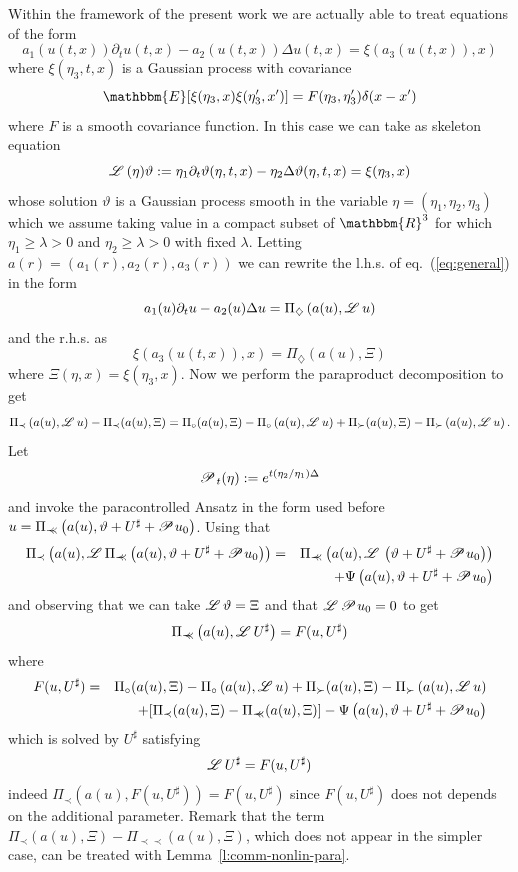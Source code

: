 \documentclass[11pt,reqno]{amsart}
\newcommand{\assign}{:=}
\newcommand{\precprec}{\prec\!\!\!\prec}
\newcommand{\LL}{\mathscr{L} \hspace{.2em}}
\newcommand{\PP}{\mathscr{P} \hspace{.1em}}
\begin{document}
Within the framework of the present work we are actually able to treat
equations of the form
\begin{equation}
  a_1 (u (t, x)) \partial_t u (t, x) - a_2 (u (t, x)) \Delta u (t, x) = \xi
  (a_3 (u (t, x)), x) \label{eq:general}
\end{equation}
where $\xi (\eta_3, t, x)$ is a Gaussian process with covariance
\[ \mathbbm{E} [\xi (\eta_3, x) \xi (\eta'_3, x')] = F (\eta_3, \eta'_3)
   \delta (x - x') \]
where $F$ is a smooth covariance function. In this case we can take as
skeleton equation
\[ \LL (\eta) \vartheta \assign \eta_1 \partial_t \vartheta (\eta, t, x) -
   \eta_2 \Delta \vartheta (\eta, t, x) = \xi (\eta_3, x) \]
whose solution $\vartheta$ is a Gaussian process smooth in the variable $\eta
= (\eta_1, \eta_2, \eta_3)$ which we assume taking value in a compact subset
of $\mathbbm{R}^3$ for which $\eta_1 \geqslant \lambda > 0$ and $\eta_2
\geqslant \lambda > 0$ with fixed $\lambda$. Letting $a (r) = (a_1 (r), a_2
(r), a_3 (r))$ we can rewrite the l.h.s. of eq.~(\ref{eq:general}) in the form
\[ a_1 (u) \partial_t u - a_2 (u) \Delta u = \Pi_{\diamondsuit} \left( a (u),
   \LL u \right) \]
and the r.h.s. as
\[ \xi (a_3 (u (t, x)), x) = \Pi_{\diamondsuit} (a (u), \Xi) \]
where $\Xi (\eta, x) = \xi (\eta_3, x)$. Now we perform the paraproduct
decomposition to get
\[ \Pi_{\prec} \left( a (u), \LL u \right) - \Pi_{\prec} (a (u), \Xi) =
   \Pi_{\circ} (a (u), \Xi) - \Pi_{\circ} \left( a (u), \LL u \right) +
   \Pi_{\succ} (a (u), \Xi) - \Pi_{\succ} \left( a (u), \LL u \right) . \]
Let
\[ \PP_t (\eta) \assign e^{t (\eta_2 / \eta_1) \Delta} \]
and invoke the paracontrolled Ansatz in the form used before $u =
\Pi_{\precprec} \left( a (u), \vartheta + U^{\sharp} + \PP u_0 \right)$. Using
that
\begin{eqnarray*}
  \Pi_{\prec} \left( a (u), \LL \Pi_{\precprec} \left( a (u), \vartheta +
  U^{\sharp} + \PP u_0 \right) \right) & = & \Pi_{\precprec} \left( a (u), \LL
  \left( \vartheta + U^{\sharp} + \PP u_0 \right) \right)\\
  &  & + \Psi \left( a (u), \vartheta + U^{\sharp} + \PP u_0 \right)
\end{eqnarray*}
and observing that we can take $\LL \vartheta = \Xi$ and that $\LL \PP u_0 =
0$ to get
\[ \Pi_{\precprec} \left( a (u), \LL U^{\sharp} \right) = F (u, U^{\sharp}) \]
where
\begin{eqnarray*}
  F (u, U^{\sharp}) & = & \Pi_{\circ} (a (u), \Xi) - \Pi_{\circ} \left( a (u),
  \LL u \right) + \Pi_{\succ} (a (u), \Xi) - \Pi_{\succ} \left( a (u), \LL u
  \right)\\
  &  & + [\Pi_{\prec} (a (u), \Xi) - \Pi_{\precprec} (a (u), \Xi)] - \Psi
  \left( a (u), \vartheta + U^{\sharp} + \PP u_0 \right)
\end{eqnarray*}
which is solved by $U^{\sharp}$ satisfying
\[ \LL U^{\sharp} = F (u, U^{\sharp}) \]
indeed $\Pi_{\prec} (a (u), F (u, U^{\sharp})) = F (u, U^{\sharp})$ since $F
(u, U^{\sharp})$ does not depends on the additional parameter. Remark that the
term $\Pi_{\prec} (a (u), \Xi) - \Pi_{\precprec} (a (u), \Xi)$, which does not
appear in the simpler case, can be treated with
Lemma~\ref{l:comm-nonlin-para}.
\end{document}
